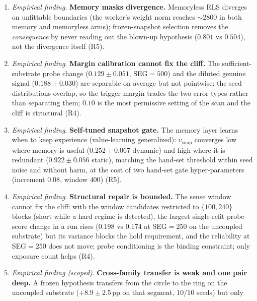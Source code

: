 \documentclass[preprint,12pt]{elsarticle}
\begin{document}
\begin{enumerate}[label=\arabic*.]
The ring is never repaired ($0.565$ and $0.584$ against $0.502$--$0.556$ for
fixed-basis references) and never expanded into, but the ladder is capped at
cubic coordinate powers, so for a seed that already reached the top rung no
upgrade exists to be refused: this is an open failure, not a demonstrated
refusal, and it is the case the D3 conjecture predicts. Zero-padding preserves
memory across the upgrades that did occur (R3/R5).
\item \emph{Empirical finding}. \textbf{Memory masks divergence.} Memoryless RLS diverges on
unfittable boundaries (the worker's weight norm reaches $\sim2800$ in both
memory and memoryless arms); frozen-snapshot selection removes the
\emph{consequence} by never reading out the blown-up hypothesis
($0.801$ vs $0.504$), not the divergence itself (R5).
\item \emph{Empirical finding}. \textbf{Margin calibration cannot fix the cliff.} The sufficient-substrate
probe change ($0.129\pm0.051$, SEG$=500$) and the diluted genuine signal
($0.188\pm0.030$) are separable on average but not pointwise: the seed
distributions overlap, so the trigger margin trades the two error types
rather than separating them; $0.10$ is the most permissive setting of the
scan and the cliff is structural (R4).
\item \emph{Empirical finding}. \textbf{Self-tuned snapshot gate.} The memory layer learns when to
keep experience (value-learning generalized): $v_{\mathrm{snap}}$ converges
low where memory is useful ($0.252\pm0.067$ dynamic) and high where it is
redundant ($0.922\pm0.056$ static), matching the hand-set threshold within
seed noise and without harm, at the cost of two hand-set gate
hyper-parameters (increment $0.08$, window $400$) (R5).
\item \emph{Empirical finding}. \textbf{Structural repair is bounded.} The sense window cannot fix the
cliff: with the window candidates restricted to $\{100,240\}$ blocks
(short while a hard regime is detected), the largest single-refit probe-score
change in a run rises ($0.198$ vs $0.174$ at SEG$=250$ on the uncoupled
substrate) but its variance blocks the hold requirement, and the reliability
at SEG$=250$ does not move; probe conditioning is the binding constraint; only
exposure count helps (R4).
\item \emph{Empirical finding (scoped)}. \textbf{Cross-family transfer is weak and one pair deep.}
A frozen hypothesis transfers from the circle to the ring on the uncoupled
substrate ($+8.9\pm2.5$\,pp on that segment, $10/10$ seeds) but only

\end{enumerate}
\end{document}

